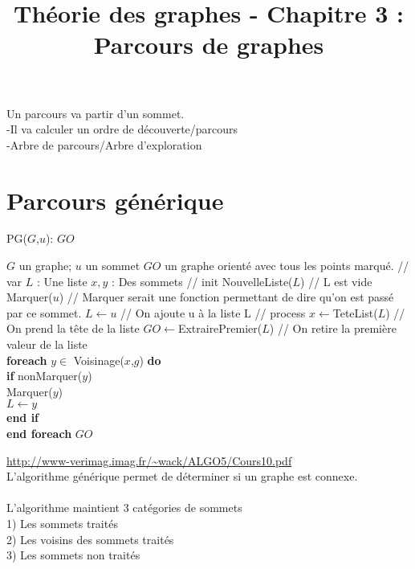 \documentclass{article}
\title{Théorie des graphes - Chapitre 3 : Parcours de graphes }
\author{}
\date{}
\begin{document}
\maketitle{}
\tableofcontents
\newpage
Un parcours va partir d’un sommet. \\
-Il va calculer un ordre de découverte/parcours \\
-Arbre de parcours/Arbre d’exploration \\
\section{Parcours générique}
\begin{algorithm}
\caption{PG($G$,$u$): $GO$}
\begin{algorithmic}
\REQUIRE $G$ un graphe; $u$ un sommet 
\ENSURE $GO$ un graphe orienté avec tous les points marqué.
\STATE // var 
\STATE $L$ : Une liste 
\STATE $x,y$ : Des sommets 
\STATE // init
\STATE NouvelleListe($L$) // L est vide 
\STATE Marquer($u$) // Marquer serait une fonction permettant de dire qu'on est passé par ce sommet.
\STATE $L \leftarrow u$ // On ajoute u à la liste L 
\STATE // process
\STATE $x \leftarrow $TeteList($L$) // On prend la tête de la liste
\STATE $GO \leftarrow $ExtrairePremier($L$) // On retire la première valeur de la liste \\
\textbf{foreach} $y \in$ Voisinage($x$,$g$) \textbf{do} \\
\hspace{0.5cm} \textbf{if} nonMarquer($y$) \\
\hspace{1cm} Marquer($y$) \\
\hspace{1cm} $L \leftarrow y$ \\
\hspace{0.5cm} \textbf{end if} \\
\textbf{end foreach}
\ENDWHILE 
\RETURN $GO$

\end{algorithmic}
\end{algorithm}
\url{http://www-verimag.imag.fr/~wack/ALGO5/Cours10.pdf} \\
L’algorithme générique permet de déterminer si un graphe est connexe. \\
\\
L’algorithme maintient 3 catégories de sommets \\
1) Les sommets traités \\
2) Les voisins des sommets traités \\
3) Les sommets non traités \\ 
\end{document}
